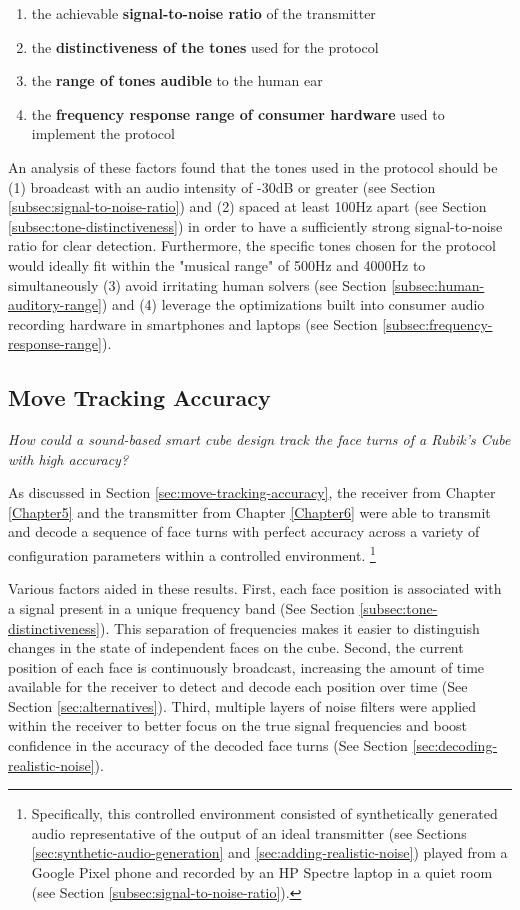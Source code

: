 \begin{enumerate}
    \item the achievable \textbf{signal-to-noise ratio} of the transmitter
    \item the \textbf{distinctiveness of the tones} used for the protocol
    \item the \textbf{range of tones audible} to the human ear
    \item the \textbf{frequency response range of consumer hardware} used to implement the protocol
\end{enumerate}

An analysis of these factors found that the tones used in the protocol
should be (1) broadcast with an audio intensity of -30dB or greater
(see Section \ref{subsec:signal-to-noise-ratio}) and (2) spaced at
least 100Hz apart (see Section \ref{subsec:tone-distinctiveness}) in
order to have a sufficiently strong signal-to-noise ratio for clear
detection. Furthermore, the specific tones chosen for the protocol
would ideally fit within the "musical range" of 500Hz and 4000Hz to
simultaneously (3) avoid irritating human solvers (see Section
\ref{subsec:human-auditory-range}) and (4) leverage the optimizations
built into consumer audio recording hardware in smartphones and laptops
(see Section \ref{subsec:frequency-response-range}).

\subsection{Move Tracking Accuracy}
\label{subsec:answer-accuracy}

\emph{How could a sound-based smart cube design track the face turns of
a Rubik's Cube with high accuracy?}

As discussed in Section \ref{sec:move-tracking-accuracy}, the receiver
from Chapter \ref{Chapter5} and the transmitter from Chapter
\ref{Chapter6} were able to transmit and decode a sequence of face
turns with perfect accuracy across a variety of configuration
parameters within a controlled environment. \footnote{Specifically,
this controlled environment consisted of synthetically generated audio
representative of the output of an ideal transmitter (see Sections
\ref{sec:synthetic-audio-generation} and
\ref{sec:adding-realistic-noise}) played from a Google Pixel phone and
recorded by an HP Spectre laptop in a quiet room (see Section
\ref{subsec:signal-to-noise-ratio}).}

Various factors aided in these results. First, each face position is
associated with a signal present in a unique frequency band (See
Section \ref{subsec:tone-distinctiveness}). This separation of
frequencies makes it easier to distinguish changes in the state of
independent faces on the cube. Second, the current position of each
face is continuously broadcast, increasing the amount of time available
for the receiver to detect and decode each position over time (See
Section \ref{sec:alternatives}). Third, multiple layers of noise
filters were applied within the receiver to better focus on the true
signal frequencies and boost confidence in the accuracy of the decoded
face turns (See Section \ref{sec:decoding-realistic-noise}).


